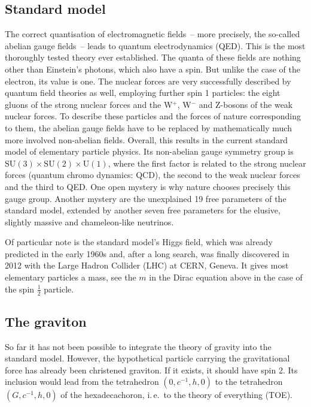 \documentclass{scrartcl}
\begin{document}
\subsection*{Standard model}

The correct quantisation of electromagnetic fields~-- more precisely, the so-called abelian gauge fields~-- leads to quantum electrodynamics (QED). This is the most thoroughly tested theory ever established. The quanta of these fields are nothing other than Einstein's photons, which also have a spin. But unlike the case of the electron, its value is one. The nuclear forces are very successfully described by quantum field theories as well, employing further spin 1 particles: the eight gluons of the strong nuclear forces and the W$^+$, W$^-$ and Z-bosons of the weak nuclear forces. To describe these particles and the forces of nature corresponding to them, the abelian gauge fields have to be replaced by mathematically much more involved non-abelian fields. Overall, this results in the current standard model of elementary particle physics. Its non-abelian gauge symmetry group is $\mathrm{SU}(3) \times \mathrm{SU}(2) \times \mathrm{U}(1)$, where the first factor is related to the strong nuclear forces (quantum chromo dynamics: QCD), the second to the weak nuclear forces and the third to QED. One open mystery is why nature chooses precisely this gauge group. Another mystery are the unexplained 19 free parameters of the standard model, extended by another seven free parameters for the elusive, slightly massive and chameleon-like neutrinos.

Of particular note is the standard model's Higgs field, which was already predicted in the early 1960s and, after a long search, was finally discovered in 2012 with the Large Hadron Collider (LHC) at CERN, Geneva. It gives most elementary particles a mass, see the $m$ in the Dirac equation above in the case of the spin $\frac12$ particle.


\subsection*{The graviton}

So far it has not been possible to integrate the theory of gravity into the standard model. However, the hypothetical particle carrying the gravitational force has already been christened graviton. If it exists, it should have spin 2. Its inclusion would lead from the tetrahedron $(0, c^{-1},h,0)$ to the tetrahedron $(G,c^{-1},h,0)$ of the hexadecachoron, i.\,e.\ to the theory of everything (TOE).
\end{document}
